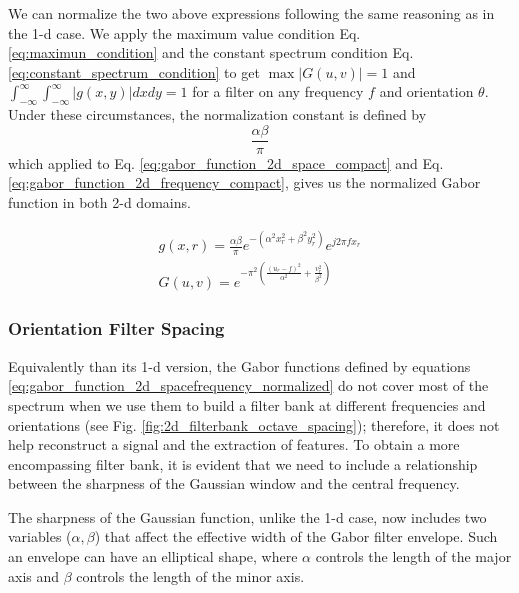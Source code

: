 \documentclass[journal]{IEEEtran}
\begin{document}
We can normalize the two above expressions following the same reasoning as in the 1-d case. We apply the maximum value condition Eq. \eqref{eq:maximun_condition} and the constant spectrum condition Eq. \eqref{eq:constant_spectrum_condition} to get $\max{|G(u,v)|} = 1$ and $\int_{-\infty}^{\infty} \int_{-\infty}^{\infty} |g(x,y)| dx dy = 1$ for a filter on any frequency $f$ and orientation $\theta$. 
Under these circumstances, the normalization constant is defined by
\begin{equation}\label{eq:normalization_constant_2d}
    \frac{\alpha \beta}{\pi}
\end{equation}
which applied to Eq. \eqref{eq:gabor_function_2d_space_compact}  and Eq. \eqref{eq:gabor_function_2d_frequency_compact}, gives us the normalized Gabor function in both 2-d domains. 

\begin{equation}\label{eq:gabor_function_2d_spacefrequency_normalized}
    \begin{gathered}
        g(x, r) = \frac{\alpha \beta}{\pi} e ^{-\left(\alpha^2 x_r^2 + \beta^2 y_r^2\right)} e ^{j 2 \pi f x_r } \\
        G(u, v) =   e ^{- \pi^2 \left(\frac{\left( u_r - f\right)^2}{\alpha^2} + \frac{v_r^2}{\beta^2}\right)} 
     \end{gathered}
\end{equation}

\subsubsection{Orientation Filter Spacing}

Equivalently than its 1-d version, the Gabor functions defined by equations \eqref{eq:gabor_function_2d_spacefrequency_normalized} do not cover most of the spectrum when we use them to build a filter bank at different frequencies and orientations (see Fig. \ref{fig:2d_filterbank_octave_spacing}); therefore, it does not help reconstruct a signal and the extraction of features. To obtain a more encompassing filter bank, it is evident that we need to include a relationship between the sharpness of the Gaussian window and the central frequency. 

The sharpness of the Gaussian function, unlike the 1-d case, now includes two variables ($\alpha, \beta$) that affect the effective width of the Gabor filter envelope. Such an envelope can have an elliptical shape, where $\alpha $ controls the length of the major axis and $\beta$ controls the length of the minor axis. 
\end{document}
